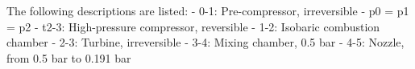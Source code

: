 The following descriptions are listed:  
- 0-1: Pre-compressor, irreversible  
- p0 = p1 = p2  
- t2-3: High-pressure compressor, reversible  
- 1-2: Isobaric combustion chamber  
- 2-3: Turbine, irreversible  
- 3-4: Mixing chamber, 0.5 bar  
- 4-5: Nozzle, from 0.5 bar to 0.191 bar